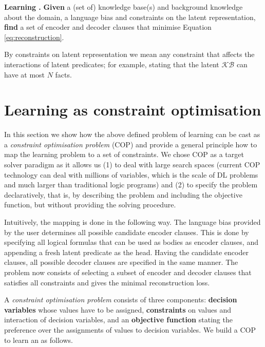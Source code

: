 \begin{definition}
\textbf{Learning .}
\textbf{Given} a (set of) knowledge base(s) and background knowledge about the domain, a language bias and constraints on the latent representation, \textbf{find} a set of encoder and decoder clauses that minimise Equation \ref{eq:reconstruction}. 
\end{definition}

By constraints on latent representation we mean any constraint that affects the interactions of latent predicates; for example, stating that the latent $\mathcal{KB}$ can have at most $N$ facts.



\section{Learning as constraint optimisation}

In this section we show how the above defined problem of learning  can be cast as a \textit{constraint optimisation problem} (COP) \cite{Rossi:2006:HCP:1207782} and provide a general principle how to map the learning problem to a set of constraints.
We chose COP as a target solver paradigm as it allows us (1) to deal with large search spaces (current COP technology can deal with millions of variables, which is the scale of DL problems and much larger than traditional logic programs) and (2) to specify the problem declaratively, that is, by describing the problem and including the objective function, but without providing the solving procedure.


Intuitively, the mapping is done in the following way.
The language bias provided by the user determines all possible candidate encoder clauses. This is done by specifying all logical formulas that can be used as bodies as encoder clauses, and appending a fresh latent predicate as the head.
Having the candidate encoder clauses, all possible decoder clauses are specified in the same manner.
The problem now consists of selecting a subset of encoder and decoder clauses that satisfies all constraints and gives the minimal reconstruction loss.

  

A \textit{constraint optimisation problem} consists of three components: \textbf{decision variables} whose values have to be assigned, \textbf{constraints} on values and interaction of decision variables, and an \textbf{objective function} stating the preference over the assignments of values to decision variables. We build a COP to learn an \alp{}  as follows.


